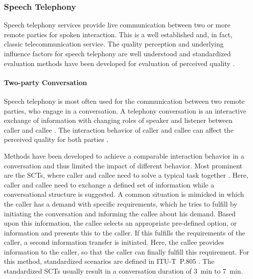 \subsubsection*{Speech Telephony}\label{method:sct}
Speech telephony services provide live communication between two or more remote parties for spoken interaction.
This is a well established and, in fact, classic telecommunication service.
The quality perception and underlying influence factors for speech telephony are well understood and standardized evaluation methods have been developed for evaluation of perceived quality \citep[\eg,][]{itu_handbook_1992}.

\paragraph*{Two-party Conversation}
Speech telephony is most often used for the communication between two remote parties, who engage in a conversation.
A telephony conversation is an interactive exchange of information with changing roles of speaker and listener between caller and callee \citep[][]{hopper_telephone_1992}.
The interaction behavior of caller and callee can affect the perceived quality for both parties \citep[\eg,][]{schoenenberg_why_2014, egger_it_2010}.

Methods have been developed to achieve a comparable interaction behavior in a conversation and thus limited the impact of different behavior.
Most prominent are the \acp{SCT}, where caller and callee need to solve a typical task together \citep[][p.~76]{moller_assessment_2000}.
Here, caller and callee need to exchange a defined set of information while a conversational structure is suggested.
A common situation is mimicked in which the caller has a demand with specific requirements, which he tries to fulfill by initiating the conversation and informing the callee about his demand.
Based upon this information, the callee selects an appropriate pre-defined option, or information and presents this to the caller.
If this fulfills the requirements of the caller, a second information transfer is initiated.
Here, the callee provides information to the caller, so that the caller can finally fulfill this requirement.
For this method, standardized scenarios are defined in ITU-T~P.805 \citep{itu-t_p.805:_2007}.
The standardized \acp{SCT} \citep{itu-t_p.805:_2007} usually result in a conversation duration of 3~min to 7~min.

